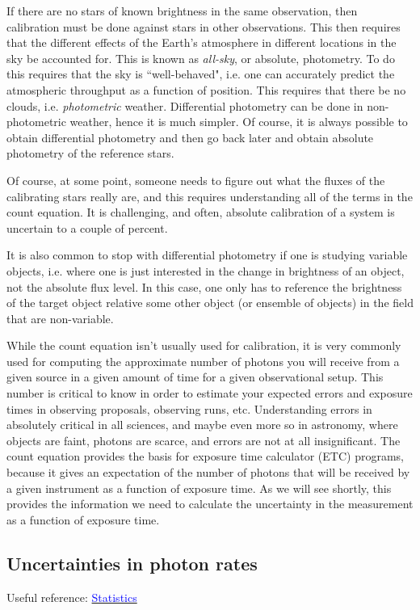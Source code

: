 \documentclass[12pt]{article}
\begin{document}
If there are no stars of known brightness in the same
observation, then calibration must be done against stars in other
observations. This then requires that the different effects of the
Earth's atmosphere in different locations in the sky be accounted for.
This is known as \emph{all-sky}, or absolute, photometry. To do this requires
that the sky is ``well-behaved", i.e. one can accurately predict the
atmospheric throughput as a function of position. This requires that
there be no clouds, i.e. \emph{photometric} weather. Differential photometry
can be done in non-photometric weather, hence it is much simpler. Of
course, it is always possible to obtain differential photometry and
then go back later and obtain absolute photometry of the reference
stars.

Of course, at some point, someone needs to figure out what
the fluxes of the calibrating stars really are, and this requires
understanding all of the terms in the count equation. It is
challenging, and often, absolute calibration of a system is uncertain
to a couple of percent.

It is also common to stop with differential photometry if
one is studying variable objects, i.e. where one is just interested in
the change in brightness of an object, not the absolute flux level. In
this case, one only has to reference the brightness of the target
object relative some other object (or ensemble of objects) in the
field that are non-variable.

While the count equation isn't usually used for calibration,
it is very commonly used for computing the approximate number of
photons you will receive from a given source in a given amount of time
for a given observational setup. This number is critical to know in
order to estimate your expected errors and exposure times in observing
proposals, observing runs, etc. Understanding errors in absolutely
critical in all sciences, and maybe even more so in astronomy, where
objects are faint, photons are scarce, and errors are not at all
insignificant. The count equation provides the basis for exposure time
calculator (ETC) programs, because it gives an expectation of the
number of photons that will be received by a given instrument as a
function of exposure time. As we will see shortly, this provides the
information we need to calculate the uncertainty in the measurement as
a function of exposure time.


\subsection*{Uncertainties in photon rates}
Useful reference:
\href{http://users.wfu.edu/ecarlson/skeptic/statistics.pdf}
{\textcolor{blue}{Statistics}}
\end{document}
